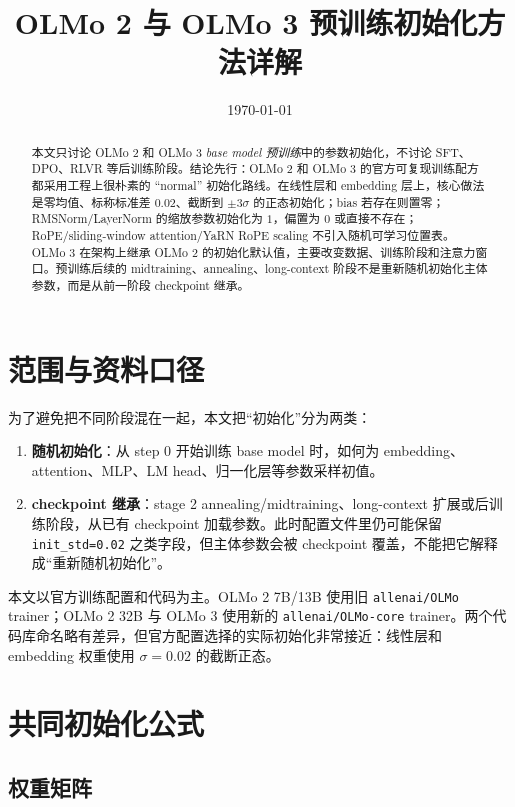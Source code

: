\documentclass[UTF8,a4paper,11pt]{ctexart}
\title{OLMo 2 与 OLMo 3 预训练初始化方法详解}
\author{}
\date{\today}
\begin{document}
\maketitle

\begin{abstract}
本文只讨论 OLMo 2 和 OLMo 3 \emph{base model 预训练}中的参数初始化，不讨论 SFT、DPO、RLVR 等后训练阶段。结论先行：OLMo 2 和 OLMo 3 的官方可复现训练配方都采用工程上很朴素的 ``normal'' 初始化路线。在线性层和 embedding 层上，核心做法是零均值、标称标准差 $0.02$、截断到 $\pm 3\sigma$ 的正态初始化；bias 若存在则置零；RMSNorm/LayerNorm 的缩放参数初始化为 $1$，偏置为 $0$ 或直接不存在；RoPE/sliding-window attention/YaRN RoPE scaling 不引入随机可学习位置表。OLMo 3 在架构上继承 OLMo 2 的初始化默认值，主要改变数据、训练阶段和注意力窗口。预训练后续的 midtraining、annealing、long-context 阶段不是重新随机初始化主体参数，而是从前一阶段 checkpoint 继承。
\end{abstract}

\section{范围与资料口径}

为了避免把不同阶段混在一起，本文把“初始化”分为两类：

\begin{enumerate}
  \item \textbf{随机初始化}：从 step 0 开始训练 base model 时，如何为 embedding、attention、MLP、LM head、归一化层等参数采样初值。
  \item \textbf{checkpoint 继承}：stage 2 annealing/midtraining、long-context 扩展或后训练阶段，从已有 checkpoint 加载参数。此时配置文件里仍可能保留 \texttt{init\_std=0.02} 之类字段，但主体参数会被 checkpoint 覆盖，不能把它解释成“重新随机初始化”。
\end{enumerate}

本文以官方训练配置和代码为主。OLMo 2 7B/13B 使用旧 \texttt{allenai/OLMo} trainer；OLMo 2 32B 与 OLMo 3 使用新的 \texttt{allenai/OLMo-core} trainer。两个代码库命名略有差异，但官方配置选择的实际初始化非常接近：线性层和 embedding 权重使用 $\sigma=0.02$ 的截断正态。

\section{共同初始化公式}

\subsection{权重矩阵}
\end{document}
